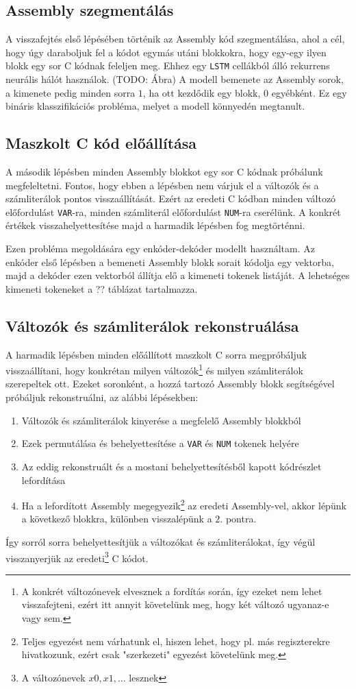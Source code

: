 \subsection{Assembly szegmentálás}
A visszafejtés első lépésében történik az Assembly kód szegmentálása, ahol
a cél, hogy úgy daraboljuk fel a kódot egymás utáni blokkokra, hogy egy-egy ilyen blokk egy
sor C kódnak feleljen meg. Ehhez egy \texttt{LSTM}\cite{lstm} cellákból álló
rekurrens neurális hálót használok. (TODO: Ábra) A modell bemenete az Assembly sorok,
a kimenete pedig minden sorra $1$, ha ott kezdődik egy blokk, $0$ egyébként. Ez
egy bináris klasszifikációs probléma, melyet a modell könnyedén megtanult.

\subsection{Maszkolt C kód előállítása}
A második lépésben minden Assembly blokkot egy sor C kódnak próbálunk
megfeleltetni. Fontos, hogy ebben a lépésben nem várjuk el a változók és
a számliterálok pontos visszaállítását. Ezért az eredeti C kódban minden
változó előfordulást \texttt{VAR}-ra, minden számliterál előfordulást
\texttt{NUM}-ra cserélünk. A konkrét értékek visszahelyettesítése majd
a harmadik lépésben fog megtörténni.

Ezen probléma megoldására egy enkóder-dekóder modellt használtam. Az enkóder
első lépésben a bemeneti Assembly blokk sorait kódolja egy vektorba, majd
a dekóder ezen vektorból állítja elő a kimeneti tokenek listáját. A lehetséges
kimeneti tokeneket a ?? táblázat tartalmazza.

\subsection{Változók és számliterálok rekonstruálása}
A harmadik lépésben minden előállított maszkolt C sorra megpróbáljuk
visszaállítani, hogy konkrétan milyen változók\footnote{A konkrét változónevek
elvesznek a fordítás során, így ezeket nem lehet visszafejteni, ezért itt
annyit követelünk meg, hogy két változó ugyanaz-e vagy sem.} és milyen
számliterálok szerepeltek ott. Ezeket soronként, a hozzá tartozó Assembly blokk
segítségével próbáljuk rekonstruálni, az alábbi lépésekben:
\begin{enumerate}
    \item Változók és számliterálok kinyerése a megfelelő Assembly blokkból
    \item Ezek permutálása és behelyettesítése a \texttt{VAR} és \texttt{NUM}
    tokenek helyére
    \item Az eddig rekonstruált és a mostani behelyettesítésből kapott kódrészlet lefordítása
    \item Ha a lefordított Assembly megegyezik\footnote{Teljes egyezést nem
    várhatunk el, hiszen lehet, hogy pl. más regiszterekre hivatkozunk, ezért
    csak "szerkezeti" egyezést követelünk meg.} az eredeti Assembly-vel, akkor
    lépünk a következő blokkra, különben visszalépünk a $2.$ pontra.
\end{enumerate}
Így sorról sorra behelyettesítjük a változókat és számliterálokat, így végül
visszanyerjük az eredeti\footnote{A változónevek $x0,x1,\dots$ lesznek}
C kódot.
